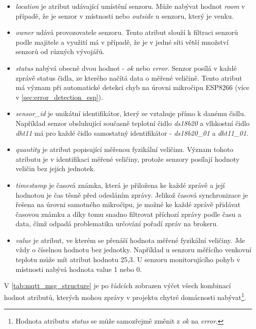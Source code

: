 \begin{itemize}
  \item \textit{location} je atribut udávající umístění senzoru. Může nabývat hodnot \textit{room} v případě, že je senzor v místnosti nebo \textit{outside} u senzoru, který je venku.
  \item \textit{owner} udává provozovatele senzoru. Tento atribut slouží k filtraci senzorů podle majitele a využití má v případě, že je v jedné síti větší množství senzorů od různých vývojářů.
  \item \textit{status} nabývá obecně dvou hodnot - \textit{ok} nebo \textit{error}. Senzor posílá v každé zprávě status čidla, ze kterého načítá data o měřené veličině. Tento atribut má význam při automatické detekci chyb na úrovni mikročipu ESP8266 (více v \cref{sec:error_detection_esp}). 
  \item \textit{sensor\_id} je unikátní identifikátor, který se vztahuje přímo k danému čidlu. Například senzor obsluhující současně teplotní čidlo \textit{ds18b20} a vlhkostní čidlo \textit{dht11} má pro každé čidlo samostatný identifikátor - \textit{ds18b20\_01} a \textit{dht11\_01}. 
  \item \textit{quantity} je atribut popisující měřenou fyzikální veličinu. Význam tohoto atributu je v identifikaci měřené veličiny, protože senzory posílají hodnoty veličin bez jejich jednotek.  
  \item \textit{timestamp} je časová známka, která je přiložena ke každé zprávě a její hodnotou je čas těsně před odesláním zprávy. Jelikož časová synchronizace je řešena na úrovni samotného mikročipu, je možné ke každé zprávě přidávat časovou známku a díky tomu snadno filtrovat příchozí zprávy podle času a data, čímž odpadá problematika určování pořadí zpráv na brokeru.   
  \item \textit{value} je atribut, ve kterém se přenáší hodnota měřené fyzikální veličiny. Jde vždy o číselnou hodnotu bez jednotky. Například u senzoru měřícího venkovní teplotu může mít atribut hodnotu 25,3. U senzoru monitorujícího pohyb v místnosti nabývá hodnota value 1 nebo 0.  
\end{itemize}

V \cref{tab:mqtt_msg_structure} je po řádcích zobrazen výčet všech kombinací hodnot atributů, kterých mohou zprávy v projektu chytré domácnosti nabývat\footnote{Hodnota atributu \textit{status} se může samozřejmě změnit z \textit{ok} na \textit{error}.}.  

